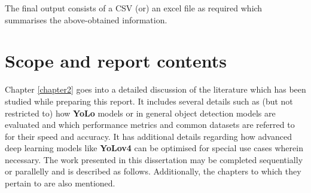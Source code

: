The final output consists of a CSV (or) an excel file as required
which summarises the above-obtained information.

\section{Scope and report contents}

Chapter \ref{chapter2} goes into a detailed discussion of the
literature which has been studied while preparing this report. It
includes several details such as (but not restricted to) how
\textbf{YoLo} models or in general object detection models are
evaluated and which performance metrics and common datasets are
referred to for their speed and accuracy. It has additional details
regarding how advanced deep learning models like \textbf{YoLov4} can
be optimised for special use cases wherein necessary. The work
presented in this dissertation may be completed sequentially or
parallelly and is described as follows. Additionally, the chapters to
which they pertain to are also mentioned.

